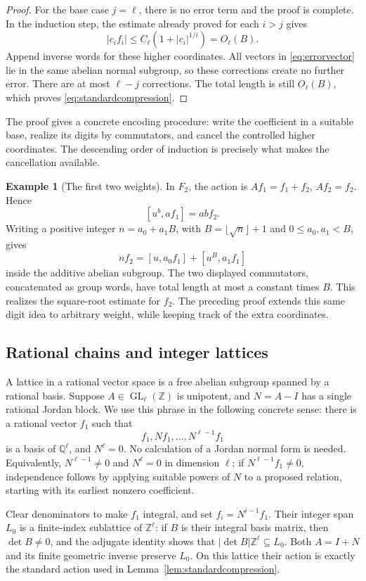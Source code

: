 \documentclass[11pt]{article}
\numberwithin{equation}{section}
\theoremstyle{definition}
\newtheorem{example}[theorem]{Example}
\theoremstyle{remark}
\newcommand{\Z}{\mathbb Z}
\newcommand{\Q}{\mathbb Q}
\newcommand{\GL}{\operatorname{GL}}
\begin{document}
\begin{proof}
For the base case $j=\ell$, there is no error term and the proof is complete. In the induction step, the estimate already proved for each $i>j$ gives
\[
|c_i f_i|\le C_\ell(1+|c_i|^{1/i})=O_\ell(B).
\]
Append inverse words for these higher coordinates. All vectors in \eqref{eq:errorvector} lie in the same abelian normal subgroup, so these corrections create no further error. There are at most $\ell-j$ corrections. The total length is still $O_\ell(B)$, which proves \eqref{eq:standardcompression}.
\end{proof}

The proof gives a concrete encoding procedure: write the coefficient in a suitable base, realize its digits by commutators, and cancel the controlled higher coordinates. The descending order of induction is precisely what makes the cancellation available.

\begin{example}[The first two weights]
In $F_2$, the action is $Af_1=f_1+f_2$, $Af_2=f_2$. Hence
\[
[u^b,a f_1]=ab f_2.
\]
Writing a positive integer $n=a_0+a_1B$, with $B=\lfloor\sqrt n\rfloor+1$ and $0\le a_0,a_1<B$, gives
\[
n f_2=[u,a_0 f_1]+[u^B,a_1 f_1]
\]
inside the additive abelian subgroup. The two displayed commutators, concatenated as group words, have total length at most a constant times $B$. This realizes the square-root estimate for $f_2$. The preceding proof extends this same digit idea to arbitrary weight, while keeping track of the extra coordinates.
\end{example}

\subsection{Rational chains and integer lattices}
A lattice in a rational vector space is a free abelian subgroup spanned by a rational basis. Suppose $A\in\GL_\ell(\Z)$ is unipotent, and $N=A-I$ has a single rational Jordan block. We use this phrase in the following concrete sense: there is a rational vector $f_1$ such that
\[
f_1,Nf_1,\ldots,N^{\ell-1}f_1
\]
is a basis of $\Q^\ell$, and $N^\ell=0$. No calculation of a Jordan normal form is needed. Equivalently, $N^{\ell-1}\ne0$ and $N^\ell=0$ in dimension $\ell$; if $N^{\ell-1}f_1\ne0$, independence follows by applying suitable powers of $N$ to a proposed relation, starting with its earliest nonzero coefficient.

Clear denominators to make $f_1$ integral, and set $f_i=N^{i-1}f_1$. Their integer span $L_0$ is a finite-index sublattice of $\Z^\ell$: if $B$ is their integral basis matrix, then $\det B\ne0$, and the adjugate identity shows that $|\det B|\Z^\ell\subseteq L_0$. Both $A=I+N$ and its finite geometric inverse preserve $L_0$. On this lattice their action is exactly the standard action used in Lemma~\ref{lem:standardcompression}.
\end{document}
